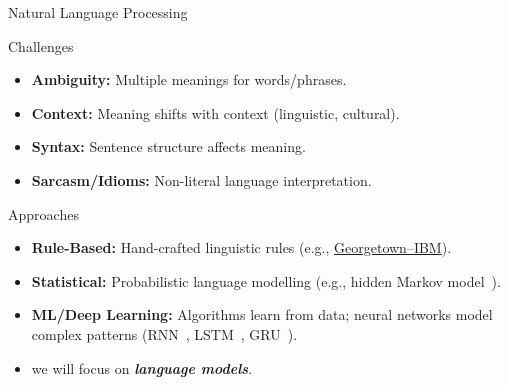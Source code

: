 \documentclass[presentation, 10pt]{beamer}\mode<presentation>{\usetheme{AMSBolognaFC}}
\begin{document}
\begin{frame}{Natural Language Processing}
    \begin{alertblock}{Challenges}
        \begin{itemize}
            \item \textbf{Ambiguity:} Multiple meanings for words/phrases.
            \item \textbf{Context:} Meaning shifts with context (linguistic, cultural).
            \item \textbf{Syntax:} Sentence structure affects meaning.
            \item \textbf{Sarcasm/Idioms:} Non-literal language interpretation.
        \end{itemize}
    \end{alertblock}
    \begin{exampleblock}{Approaches}
        \begin{itemize}
            \item \textbf{Rule-Based:} Hand-crafted linguistic rules (e.g., \href{https://en.wikipedia.org/wiki/Georgetown-IBM\_experiment}{Georgetown–IBM}).
            \item \textbf{Statistical:} Probabilistic language modelling (e.g., hidden Markov model~\cite{DBLP:journals/coling/Merialdo94}).
            \item \textbf{ML/Deep Learning:} Algorithms learn from data; neural networks model complex patterns (RNN~\cite{DBLP:journals/corr/0001KYS17}, LSTM~\cite{DBLP:journals/neco/HochreiterS97}, GRU~\cite{DBLP:conf/mwscas/DeyS17}).
            \item[\faArrowRight] we will focus on \emph{\textbf{language models}}.
        \end{itemize}
    \end{exampleblock}
\end{frame}
\end{document}
